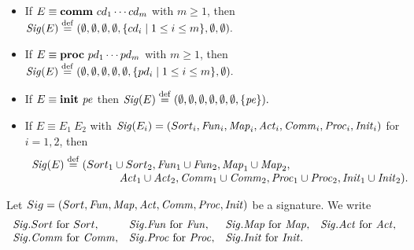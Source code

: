 \documentclass[fleqn,a4paper]{article}
\newcommand{\Sig}{\nm{Sig}}
\newcommand{\Fun}{\nm{Fun}}
\newcommand{\wor}{\stackrel{\mathrm{def}}{=}}
\begin{document}
\begin{defn}
\begin{itemize}
If $E\equiv
\act~\ad_1\cdots \ad_m$ with $m\geq 1$,
then
$\Sig(E)\wor(\emptyset,\emptyset,\emptyset,\Act,
\emptyset,\emptyset,
\emptyset)$, where
\[\begin{array}{lll}
\Act&\wor&
\{n_{i}\mid ad_i\equiv
n_{i}, 1\leq i\leq m \}\\
&\cup&\{n_{ij}\ap S_{i1}\times\cdots\times S_{ik_i}\mid\\
&&~~~~~ad_i\equiv
n_{i1},\ldots,n_{il_i}\ap S_{i1}\times\cdots\times S_{ik_i}, 1\leq i\leq
m, 1\leq j\leq l_i\}.
\end{array}
\]
\item
If $E\equiv
\mathbf{comm}~cd_1\cdots cd_m$ with $m\geq 1$,
then
$\Sig(E)\wor(\emptyset,\emptyset,\emptyset,\emptyset,
\{cd_i\mid 1\leq
i\leq m\}, \emptyset,\emptyset).$
\item
If $E\equiv
\mathbf{proc}~pd_1\cdots pd_m$ with $m\geq 1$,
then
$\Sig(E)\wor(\emptyset,\emptyset,\emptyset,\emptyset,\emptyset,
\{pd_i\mid 1\leq i\leq m\},\emptyset).$
\item
If $E\equiv
\mathbf{init}~{\it pe}$ then $\Sig(E)\wor(\emptyset,\emptyset,\emptyset,\emptyset,\emptyset,
\emptyset,\{\pe\}).$
\item
If $E\equiv E_1~E_2$
with $\Sig(E_i)=(Sort_{i},\Fun_{i},\Map_i,
\Act_{i},\Comm_{i},\Proc_{i},\Init_i)$ for $i=1,2$, then
\[\begin{array}{l}
\Sig(E)\wor(Sort_{1}\cup Sort_{2},\Fun_{1}\cup \Fun_{2},
\Map_1\cup\Map_2,\\
\hspace{8em}\Act_{1}\cup \Act_{2},\Comm_{1}\cup \Comm_{2},\Proc_{1}\cup
\Proc_{2},
\Init_1\cup\Init_2).
\end{array}\]
\end{itemize}
\end{defn}
\begin{defn}
Let $Sig=(Sort,\Fun,\Map,\Act,\Comm,\Proc,\Init)$ be a signature. We write
\[\begin{array}{llll}
\Sig.Sort~\mbox{for}~Sort,&
\Sig.\Fun~\mbox{for}~\Fun,&
\Sig.\Map~{\rm for}~\Map,&
\Sig.\Act~\mbox{for}~\Act,\\
\Sig.\Comm~\mbox{for}~\Comm,&
\Sig.\Proc~\mbox{for}~\Proc,&
\Sig.\Init~\mbox{for}~\Init.
\end{array}\]
\end{defn}
\end{document}
